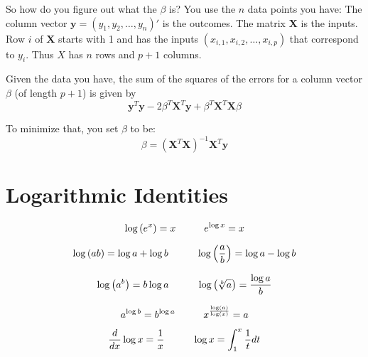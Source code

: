 \documentclass[12pt]{article}
\begin{document}
So how do you figure out what the $\beta$ is? You use the $n$ data points you have: The column vector $\boldsymbol{y} = (y_1, y_2, \ldots, y_n)'$ is the outcomes. The matrix $\boldsymbol{X}$ is the inputs.  Row $i$ of $\boldsymbol{X}$ starts with 1 and has the inputs $(x_{i,1}, x_{i,2},\ldots,x_{i, p})$ that correspond to $y_i$. Thus $X$ has $n$ rows and $p+1$ columns.

Given the data you have, the sum of the squares of the errors for a column vector $\beta$ (of length $p + 1$) is given by 
\begin{equation*}
\boldsymbol{y}^T \boldsymbol{y} - 2 \beta^T \boldsymbol{X}^T \boldsymbol{y} + \beta^T \boldsymbol{X}^T \boldsymbol{X} \beta
\end{equation*}

To minimize that, you set $\beta$ to be:
\begin{equation*}
\beta = \left( \boldsymbol{X}^T \boldsymbol{X} \right)^{-1} \boldsymbol{X}^T \boldsymbol{y}
\end{equation*}

\section*{Logarithmic Identities}

\begin{equation*}
\log{\left( e^x \right)} = x \hspace{10mm} e^{\log{x}} = x
\end{equation*}

\begin{equation*}
\log{\left(  ab \right)} = \log a + \log b \hspace{10mm}  \log{\left(\frac{a}{b} \right)} = \log a - \log b
\end{equation*}

\begin{equation*}
\log{\left(  a^b \right)} = b\log a \hspace{10mm}  \log{\left(\sqrt[b]{a} \right)} = \frac{\log{a}}{b}
\end{equation*}

\begin{equation*}
a^{\log{b}} = b^{\log{a}}  \hspace{10mm}  x^{\frac{\log(a)}{\log(x)}} = a
\end{equation*}

\begin{equation*}
{d \over dx} \log x = {1 \over x } \hspace{10mm} \log x = \int_1^x \frac {1}{t} dt
\end{equation*}
\end{document}
